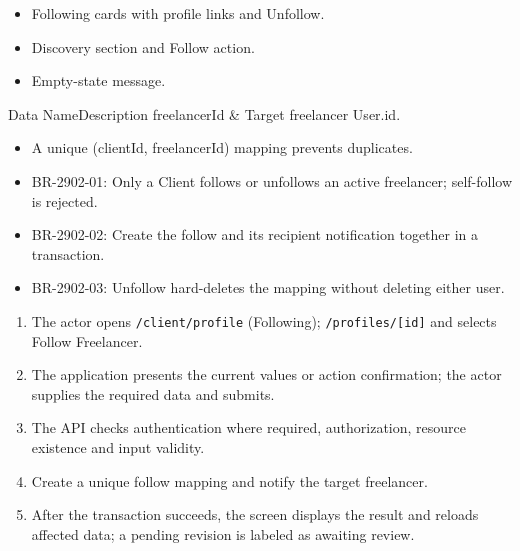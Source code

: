 \begin{itemize}[leftmargin=1.6em,topsep=3pt,itemsep=2pt,parsep=0pt,label=$\bullet$]
    \item Following cards with profile links and Unfollow.
    \item Discovery section and Follow action.
    \item Empty-state message.
\end{itemize}


\begin{specdatatable}{Data Name}{Description}
freelancerId & Target freelancer User.id.\\ \hline
\end{specdatatable}

\begin{itemize}[leftmargin=1.6em,topsep=3pt,itemsep=2pt,parsep=0pt,label=$\bullet$]
    \item A unique (clientId, freelancerId) mapping prevents duplicates.
\end{itemize}

\begin{itemize}[leftmargin=1.6em,topsep=3pt,itemsep=2pt,parsep=0pt,label=$\bullet$]\brrulelist
    \item BR-2902-01: Only a Client follows or unfollows an active freelancer; self-follow is rejected.
    \item BR-2902-02: Create the follow and its recipient notification together in a transaction.
    \item BR-2902-03: Unfollow hard-deletes the mapping without deleting either user.
\end{itemize}

\begin{enumerate}[leftmargin=1.8em,topsep=3pt,itemsep=2pt,parsep=0pt]
    \item The actor opens \texttt{/\allowbreak{}client/\allowbreak{}profile} (Following); \texttt{/\allowbreak{}profiles/\allowbreak{}[id]} and selects Follow Freelancer.
    \item The application presents the current values or action confirmation; the actor supplies the required data and submits.
    \item The API checks authentication where required, authorization, resource existence and input validity.
    \item Create a unique follow mapping and notify the target freelancer.
    \item After the transaction succeeds, the screen displays the result and reloads affected data; a pending revision is labeled as awaiting review.
\end{enumerate}

